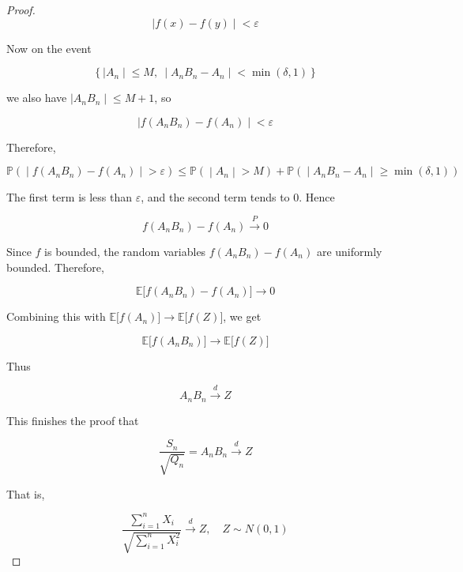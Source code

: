 \begin{proof}
\[\left. |\mathit{f}(\mathit{x}) - \mathit{f}(\mathit{y}) \middle| < \mathit{\varepsilon} \right.\]

Now on the event

\[\left\{ |\mathit{A}_{\mathit{n}} \middle| \leq \mathit{M},\  \middle| \mathit{A}_{\mathit{n}}\mathit{B}_{\mathit{n}} - \mathit{A}_{\mathit{n}} \middle| < \min(\mathit{\delta},1) \right\}\]

we also have \(\left. |\mathit{A}_{\mathit{n}}\mathit{B}_{\mathit{n}} \middle| \leq \mathit{M} + 1 \right.\), so

\[\left. |\mathit{f}(\mathit{A}_{\mathit{n}}\mathit{B}_{\mathit{n}}) - \mathit{f}(\mathit{A}_{\mathit{n}}) \middle| < \mathit{\varepsilon} \right.\]

Therefore,

\[\left. \mathbb{P}( \middle| \mathit{f}(\mathit{A}_{\mathit{n}}\mathit{B}_{\mathit{n}}) - \mathit{f}(\mathit{A}_{\mathit{n}}) \middle| > \mathit{\varepsilon}) \leq \mathbb{P}( \middle| \mathit{A}_{\mathit{n}} \middle| > \mathit{M}) + \mathbb{P}( \middle| \mathit{A}_{\mathit{n}}\mathit{B}_{\mathit{n}} - \mathit{A}_{\mathit{n}} \middle| \geq \min(\mathit{\delta},1)) \right.\]

The first term is less than \(\mathit{\varepsilon}\), and the second term tends to \(0\). Hence

\[\mathit{f}(\mathit{A}_{\mathit{n}}\mathit{B}_{\mathit{n}}) - \mathit{f}(\mathit{A}_{\mathit{n}})\overset{\mathit{P}}{\rightarrow}0\]

Since \(\mathit{f}\) is bounded, the random variables \(\mathit{f}(\mathit{A}_{\mathit{n}}\mathit{B}_{\mathit{n}}) - \mathit{f}(\mathit{A}_{\mathit{n}})\) are uniformly bounded. Therefore,

\[\mathbb{E}\lbrack\mathit{f}(\mathit{A}_{\mathit{n}}\mathit{B}_{\mathit{n}}) - \mathit{f}(\mathit{A}_{\mathit{n}})\rbrack\rightarrow 0\]

Combining this with \(\mathbb{E}\lbrack\mathit{f}(\mathit{A}_{\mathit{n}})\rbrack\rightarrow\mathbb{E}\lbrack\mathit{f}(\mathit{Z})\rbrack\), we get

\[\mathbb{E}\lbrack\mathit{f}(\mathit{A}_{\mathit{n}}\mathit{B}_{\mathit{n}})\rbrack\rightarrow\mathbb{E}\lbrack\mathit{f}(\mathit{Z})\rbrack\]

Thus

\[\mathit{A}_{\mathit{n}}\mathit{B}_{\mathit{n}}\overset{\mathit{d}}{\rightarrow}\mathit{Z}\]

This finishes the proof that

\[\frac{\mathit{S}_{\mathit{n}}}{\sqrt{\mathit{Q}_{\mathit{n}}}} = \mathit{A}_{\mathit{n}}\mathit{B}_{\mathit{n}}\overset{\mathit{d}}{\rightarrow}\mathit{Z}\]

That is,

\[\frac{\sum_{\mathit{i} = 1}^{\mathit{n}}\mathit{X}_{\mathit{i}}}{\sqrt{\sum_{\mathit{i} = 1}^{\mathit{n}}\mathit{X}_{\mathit{i}}^{2}}}\overset{\mathit{d}}{\rightarrow}\mathit{Z},\quad\mathit{Z} \sim \mathit{N}(0,1)\]

\end{proof}
